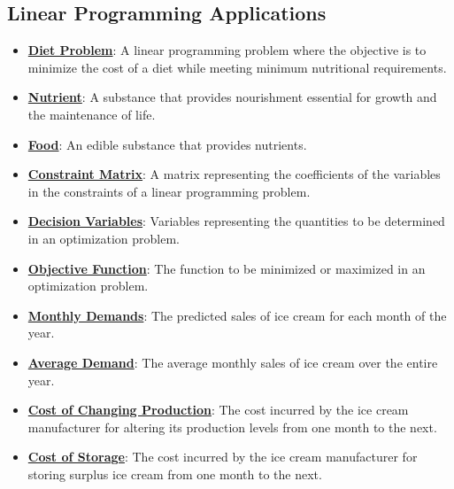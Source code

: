 \documentclass{article}%
\begin{document}
\subsection{Linear Programming Applications}%
\label{subsec:LinearProgrammingApplications}%
\begin{itemize}[leftmargin=*]%
\item \href{https://www.math.purdue.edu/~yipn/421/2024-09-19-DualityExamples.pdf#page=2}{\textbf{Diet Problem}}: A linear programming problem where the objective is to minimize the cost of a diet while meeting minimum nutritional requirements.%
\item \href{https://www.math.purdue.edu/~yipn/421/2024-09-19-DualityExamples.pdf#page=2}{\textbf{Nutrient}}: A substance that provides nourishment essential for growth and the maintenance of life.%
\item \href{https://www.math.purdue.edu/~yipn/421/2024-09-19-DualityExamples.pdf#page=2}{\textbf{Food}}: An edible substance that provides nutrients.%
\item \href{https://www.math.purdue.edu/~yipn/421/2024-09-19-DualityExamples.pdf#page=1}{\textbf{Constraint Matrix}}: A matrix representing the coefficients of the variables in the constraints of a linear programming problem.%
\item \href{https://www.math.purdue.edu/~yipn/421/2024-09-19-DualityExamples.pdf#page=1}{\textbf{Decision Variables}}: Variables representing the quantities to be determined in an optimization problem.%
\item \href{https://www.math.purdue.edu/~yipn/421/2024-09-19-DualityExamples.pdf#page=1}{\textbf{Objective Function}}: The function to be minimized or maximized in an optimization problem.%
\item \href{https://www.math.purdue.edu/~yipn/421/2024-10-28-ApplsLinProg.pdf#page=1}{\textbf{Monthly Demands}}: The predicted sales of ice cream for each month of the year.%
\item \href{https://www.math.purdue.edu/~yipn/421/2024-10-28-ApplsLinProg.pdf#page=2}{\textbf{Average Demand}}: The average monthly sales of ice cream over the entire year.%
\item \href{https://www.math.purdue.edu/~yipn/421/2024-10-28-ApplsLinProg.pdf#page=3}{\textbf{Cost of Changing Production}}: The cost incurred by the ice cream manufacturer for altering its production levels from one month to the next.%
\item \href{https://www.math.purdue.edu/~yipn/421/2024-10-28-ApplsLinProg.pdf#page=3}{\textbf{Cost of Storage}}: The cost incurred by the ice cream manufacturer for storing surplus ice cream from one month to the next.%

\end{itemize}
\end{document}
